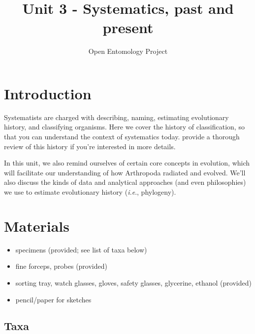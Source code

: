 \documentclass[letterpaper, 11pt]{article}
\title{Unit 3 - Systematics, past and present}
\author{Open Entomology Project}
\begin{document}
\cleanlookdateon %
\maketitle
\thispagestyle{fancy}
\section*{Introduction}
Systematists are charged with describing, naming, estimating evolutionary history, and classifying organisms. Here we cover the history of classification, so that you can understand the context of systematics today. \cite{EngelKristensen2013} provide a thorough review of this history if you're interested in more details.

In this unit, we also remind ourselves of certain core concepts in evolution, which will facilitate our understanding of how Arthropoda radiated and evolved. We'll also discuss the kinds of data and analytical approaches (and even philosophies) we use to estimate evolutionary history (\textit{i.e}., phylogeny).

\section*{Materials}

\begin{itemize}
\item specimens (provided; see list of taxa below)
\item fine forceps, probes (provided)
\item sorting tray, watch glasses, gloves, safety glasses, glycerine, ethanol (provided)
\item pencil/paper for sketches
\end{itemize}

\subsection*{Taxa}
\end{document}
